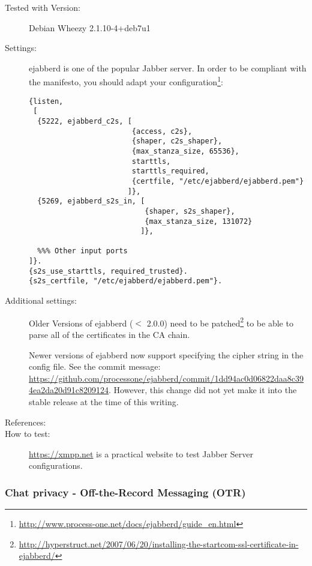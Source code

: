 \begin{description}
\item[Tested with Version:] Debian Wheezy 2.1.10-4+deb7u1

\item[Settings:] \mbox{}


ejabberd is one of the popular Jabber server.  In order to be compliant
with the manifesto, you should adapt your
configuration\footnote{\url{http://www.process-one.net/docs/ejabberd/guide_en.html}}:
\begin{lstlisting}[breaklines]
{listen,
 [
  {5222, ejabberd_c2s, [
                        {access, c2s},
                        {shaper, c2s_shaper},
                        {max_stanza_size, 65536},
                        starttls,
                        starttls_required, 
                        {certfile, "/etc/ejabberd/ejabberd.pem"}
                       ]},
  {5269, ejabberd_s2s_in, [
                           {shaper, s2s_shaper},
                           {max_stanza_size, 131072}
                          ]},

  %%% Other input ports
]}.
{s2s_use_starttls, required_trusted}.
{s2s_certfile, "/etc/ejabberd/ejabberd.pem"}.
\end{lstlisting}

\item[Additional settings:]

Older Versions of ejabberd ($ < $ 2.0.0) need to be patched\footnote{\url{http://hyperstruct.net/2007/06/20/installing-the-startcom-ssl-certificate-in-ejabberd/}} to be able to parse all of the certificates in the CA chain.

Newer versions of ejabberd now support specifying the cipher string in the config file. See the commit message: \url{https://github.com/processone/ejabberd/commit/1dd94ac0d06822daa8c394ea2da20d91c8209124}. However, this change did not yet make it into the stable release at the time of this writing. 


\item[References:] 

\item[How to test:] \url{https://xmpp.net} is a practical website to test Jabber Server configurations.

\end{description}


\subsubsection{Chat privacy - Off-the-Record Messaging (OTR)}

